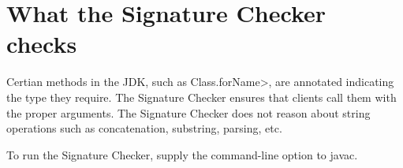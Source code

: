 \section{What the Signature Checker checks}

Certian methods in the JDK, such as \<Class.forName>, are annotated
indicating the type they require.  The Signature Checker ensures that
clients call them with the proper arguments.  The Signature Checker does
not reason about string operations such as concatenation, substring,
parsing, etc.

To run the Signature Checker, supply the  command-line option to javac.


